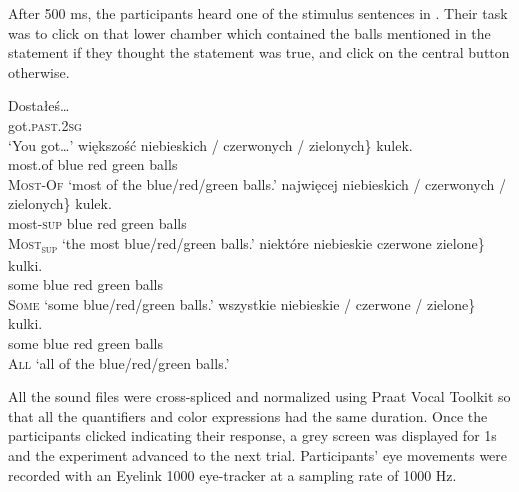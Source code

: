\documentclass[output=paper]{langscibook}
\begin{document}
After 500 ms, the participants heard one of the stimulus sentences in . Their task was to click on that lower chamber
which contained the balls mentioned in the statement if they thought the statement was true, and click on the central
button otherwise.



\ea\gll Dostałeś\dots\\
got.\textsc{past.2sg}\\
\glt `You got\dots'\label{tom:ex:dostales}
\ea \gll większość \minsp{\{} niebieskich / czerwonych / zielonych\} kulek.\\
most.of {} blue {} red {} green balls\\\hfill \textsc{Most-Of}
\glt `most of the blue/red/green balls.'
\ex \gll najwięcej \minsp{\{} niebieskich / czerwonych / zielonych\}
kulek.\\
most\textsc{-sup} {} blue {} red {} green balls\\\hfill \textsc{Most\textsubscript{sup}}
\glt `the most blue/red/green balls.'
\ex \gll niektóre \minsp{\{} niebieskie {} czerwone {} zielone\} kulki.\\
some {} blue {} red {} green balls\\\hfill \textsc{Some}
\glt `some blue/red/green balls.'
\ex \gll wszystkie \minsp{\{} niebieskie / czerwone / zielone\} kulki.\\
some {} blue {} red {} green balls\\\hfill \textsc{All}
\glt `all of the blue/red/green balls.'
\z
\z

\noindent All the sound files were cross-spliced and normalized using Praat Vocal Toolkit \citep{praatvocaltoolkit} so that all the quantifiers and color expressions had the same duration. Once the participants clicked indicating their response, a grey screen was
displayed for 1s and the experiment advanced to the next trial. Participants’ eye movements were recorded with an
Eyelink 1000 eye-tracker at a sampling rate of 1000 Hz.
\end{document}
